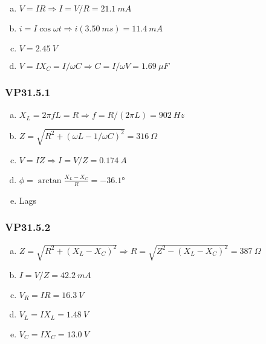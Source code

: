 \documentclass{article}
\begin{document}
\begin{enumerate}[(a)]
  \item $V = I R \Rightarrow I = V / R = \qty{21.1}{mA}$

  \item $i = I \cos \omega t \Rightarrow i(\qty{3.50}{ms}) = \qty{11.4}{mA}$

  \item $V = \qty{2.45}{V}$

  \item $V = I X_C = I / \omega C \Rightarrow C = I / \omega V = \qty{1.69}{\mu F}$
\end{enumerate}

\subsubsection{VP31.5.1}

\begin{enumerate}[(a)]
  \item $X_L = 2 \pi f L = R \Rightarrow f = R / (2 \pi L) = \qty{902}{Hz}$

  \item $Z = \sqrt{R^2 + (\omega L - 1 / \omega C)^2} = \qty{316}{\Omega}$

  \item $V = I Z \Rightarrow I = V / Z = \qty{0.174}{A}$

  \item $\phi = \arctan \frac{X_L - X_C}{R} = \ang{-36.1}$

  \item Lags
\end{enumerate}

\subsubsection{VP31.5.2}

\begin{enumerate}[(a)]
  \item $Z = \sqrt{R^2 + (X_L - X_C)^2} \Rightarrow R = \sqrt{Z^2 - (X_L - X_C)^2} = \qty{387}{\Omega}$

  \item $I = V / Z = \qty{42.2}{mA}$

  \item $V_R = I R = \qty{16.3}{V}$

  \item $V_L = I X_L = \qty{1.48}{V}$

  \item $V_C = I X_C = \qty{13.0}{V}$
\end{enumerate}
\end{document}
